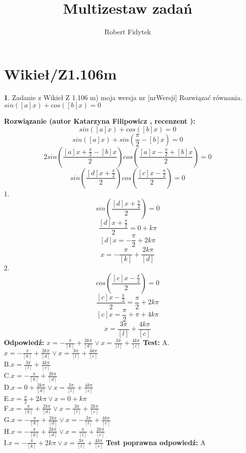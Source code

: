 \documentclass[12pt, a4paper]{article}
\title{Multizestaw zadań}
\author{Robert Fidytek}
\date{}
\theoremstyle{definition} %
\newtheorem{zad}{}
\newcommand{\kategoria}[1]{\section{#1}} %
\newcommand{\zadStart}[1]{\begin{zad}#1\newline} %
\newcommand{\zadStop}{\end{zad}}   %
\newcommand{\rozwStart}[2]{\noindent \textbf{Rozwiązanie (autor #1 , recenzent #2): }\newline} %
\newcommand{\rozwStop}{\newline}                                            %
\newcommand{\odpStart}{\noindent \textbf{Odpowiedź:}\newline}    %
\newcommand{\odpStop}{\newline}                                             %
\newcommand{\testStart}{\noindent \textbf{Test:}\newline} %
\newcommand{\testStop}{\newline} %
\newcommand{\kluczStart}{\noindent \textbf{Test poprawna odpowiedź:}\newline} %
\newcommand{\kluczStop}{\newline} %
\begin{document}
\maketitle


\kategoria{Wikieł/Z1.106m}
\zadStart{Zadanie z Wikieł Z 1.106 m) moja wersja nr [nrWersji]}
Rozwiązać równania.\\
 $sin([a]x)+cos([b]x)=0$
\zadStop
\rozwStart{Katarzyna Filipowicz}{}
$$
sin([a]x)+cos([b]x)=0
$$ $$
sin([a]x)+sin\left(\frac{\pi}{2}-[b]x\right)=0
$$ $$
2sin\left(\frac{[a]x+\frac{\pi}{2}-[b]x}{2}\right)cos\left(\frac{[a]x-\frac{\pi}{2}+[b]x}{2}\right)=0
$$ $$
sin\left(\frac{[d]x+\frac{\pi}{2}}{2}\right)cos\left(\frac{[c]x-\frac{\pi}{2}}{2}\right)=0
$$ 
1.
 $$
sin\left(\frac{[d]x+\frac{\pi}{2}}{2}\right)=0
$$ $$
\frac{[d]x+\frac{\pi}{2}}{2}=0+k\pi
$$ $$
 [d]x=-\frac{\pi}{2}+2k\pi
$$ $$
x=-\frac{\pi}{[k]}+\frac{2k\pi}{[d]}
$$
2.
$$
cos\left(\frac{[c]x-\frac{\pi}{2}}{2}\right)=0
$$ $$
\frac{[c]x-\frac{\pi}{2}}{2}=\frac{\pi}{2}+2k\pi  
$$ $$
[c]x=\frac{\pi}{2}+\pi+4k\pi  
$$ $$
x=\frac{3\pi}{[l]}+\frac{4k\pi}{[c]}
$$
\rozwStop
\odpStart
$x=-\frac{\pi}{[k]}+\frac{2k\pi}{[d]}  \vee x=\frac{3\pi}{[l]}+\frac{4k\pi}{[c]}$
\odpStop
\testStart
A.$x=-\frac{\pi}{[k]}+\frac{2k\pi}{[d]}  \vee x=\frac{3\pi}{[l]}+\frac{4k\pi}{[c]}$\\
B.$x=\frac{3\pi}{[l]}+\frac{4k\pi}{[c]}$\\
C.$x=-\frac{\pi}{[k]}+\frac{2k\pi}{[d]} $\\
D.$x=0+\frac{2k\pi}{[d]}  \vee x=\frac{3\pi}{[l]}+\frac{4k\pi}{[c]}$\\
E.$x=\frac{\pi}{2}+2k\pi    \vee x=0+k\pi$\\
F.$x=\frac{\pi}{[k]}+\frac{2k\pi}{[d]}  \vee x=\frac{3\pi}{[l]}+\frac{2k\pi}{[c]}$\\
G.$x=-\frac{\pi}{[k]}+\frac{2k\pi}{[d]}  \vee x=-\frac{3\pi}{[l]}+\frac{4k\pi}{[c]}$\\
H.$x=-\frac{\pi}{[k]}+\frac{2k\pi}{[d]}  \vee x=\frac{\pi}{[l]}+\frac{2k\pi}{[c]}$\\
I.$x=-\frac{\pi}{[k]}+2k\pi \vee x=\frac{3\pi}{[l]}+\frac{4k\pi}{[c]} $
\testStop
\kluczStart
A
\kluczStop
\end{document}
